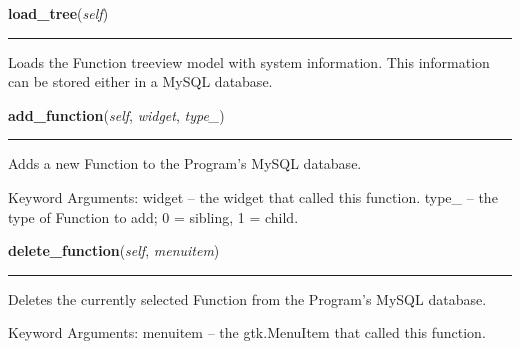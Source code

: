 \hspace{.8\funcindent}\begin{boxedminipage}{\funcwidth}

    \raggedright \textbf{load\_tree}(\textit{self})

    \vspace{-1.5ex}

    \rule{\textwidth}{0.5\fboxrule}
\setlength{\parskip}{2ex}
    Loads the Function treeview model with system information. This 
    information can be stored either in a MySQL database.

\setlength{\parskip}{1ex}
    \end{boxedminipage}

    \label{reliafree:function:Function:add_function}

    \vspace{0.5ex}

\hspace{.8\funcindent}\begin{boxedminipage}{\funcwidth}

    \raggedright \textbf{add\_function}(\textit{self}, \textit{widget}, \textit{type\_})

    \vspace{-1.5ex}

    \rule{\textwidth}{0.5\fboxrule}
\setlength{\parskip}{2ex}
    Adds a new Function to the Program's MySQL database.

    Keyword Arguments: widget -- the widget that called this function. 
    type\_  -- the type of Function to add; 0 = sibling, 1 = child.

\setlength{\parskip}{1ex}
    \end{boxedminipage}

    \label{reliafree:function:Function:delete_function}

    \vspace{0.5ex}

\hspace{.8\funcindent}\begin{boxedminipage}{\funcwidth}

    \raggedright \textbf{delete\_function}(\textit{self}, \textit{menuitem})

    \vspace{-1.5ex}

    \rule{\textwidth}{0.5\fboxrule}
\setlength{\parskip}{2ex}
    Deletes the currently selected Function from the Program's MySQL 
    database.

    Keyword Arguments: menuitem -- the gtk.MenuItem that called this 
    function.

\setlength{\parskip}{1ex}
    \end{boxedminipage}

